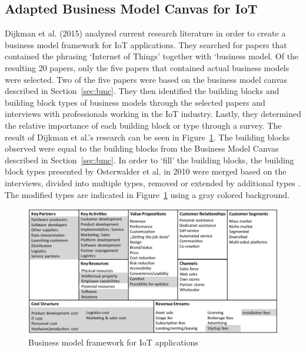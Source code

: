 	\subsection{Adapted Business Model Canvas for IoT}
		Dijkman et al. (2015) \cite{dijkman} analyzed current research literature in order to create a business model framework for IoT applications. They searched for papers that contained the phrasing `Internet of Things' together with `business model. Of the resulting 20 papers, only the five papers that contained actual business models were selected. Two of the five papers were based on the business model canvas described in Section~\ref{sec:bmc}. They then identified the building blocks and building block types of business models through the selected papers and interviews with professionals working in the IoT industry. Lastly, they determined the relative importance of each building block or type through a survey. The result of Dijkman et al.'s research can be seen in Figure~\ref{fig:bm_dijkman}. The building blocks observed were equal to the building blocks from the Business Model Canvas described in Section~\ref{sec:bmc}. In order to `fill' the building blocks, the building block types presented by Osterwalder et al. in 2010 were merged based on the interviews, divided into multiple types, removed or extended by additional types \cite{osterwalder2010} \cite{dijkman}. The modified types are indicated in Figure~\ref{fig:bm_dijkman} using a gray colored background.

		\begin{figure}[ht]
			\begin{center}
		    \includegraphics[scale=0.52]{Talk11/iot_canvas_dijkman.jpg}
		    \end{center}
		    \caption{Business model framework for IoT applications }
		    \label{fig:bm_dijkman}
		\end{figure}

